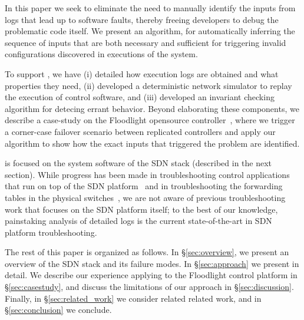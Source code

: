 In this paper we seek to eliminate the need to manually identify the inputs
from logs that lead
up to software faults, thereby freeing developers to debug the problematic code itself.
We present an algorithm, \simulator{} for automatically inferring the sequence
of inputs that are both necessary and sufficient for
triggering invalid configurations discovered in executions of the system.

To support \simulator{}, we have (i) detailed how execution logs are obtained
and what properties they need, (ii) developed a deterministic network simulator
to replay the execution of control software, and (iii) developed an invariant
checking algorithm for detecing errant behavior. Beyond elaborating these
components, we describe a case-study on the Floodlight opensource
controller~\cite{floodlight}, where we trigger a corner-case failover scenario
between replicated controllers and apply our algorithm to show how the exact
inputs that triggered the problem are identified.

\Simulator{} is focused on the
system software of the SDN stack (described in the next section). While progress has been made in troubleshooting control
applications that run on top of the SDN platform~\cite{nice} and in troubleshooting the
forwarding tables in the physical switches~\cite{hsa}, we
are not aware of previous troubleshooting work that focuses on the SDN
platform itself; to the best of our knowledge, painstaking analysis of detailed logs is the current state-of-the-art in SDN platform troubleshooting.

The rest of this paper is organized as follows. In \S\ref{sec:overview},
we present an overview of the SDN stack and its failure modes.
In \S\ref{sec:approach} we present \simulator{} in detail.
We describe our experience applying \simulator{} to the Floodlight
control platform in \S\ref{sec:casestudy}, and discuss the limitations of our
approach in \S\ref{sec:discussion}. Finally, in \S\ref{sec:related_work}
we consider related related work,
and in \S\ref{sec:conclusion} we conclude.


